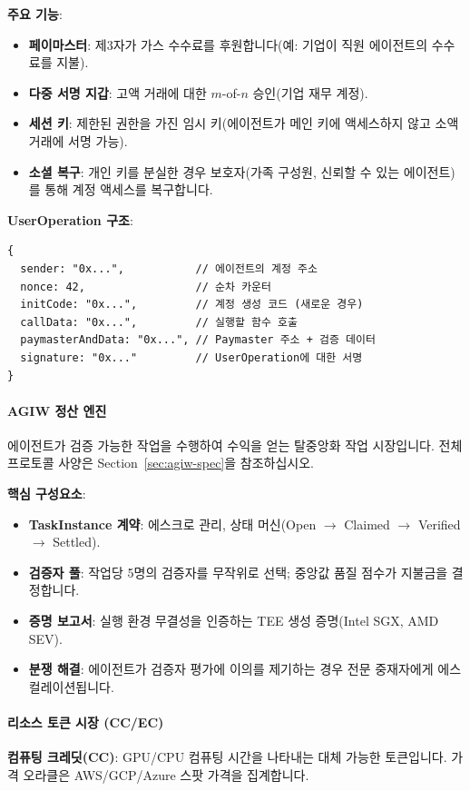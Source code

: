 \documentclass[11pt]{article}
\begin{document}
\textbf{주요 기능}:
\begin{itemize}[noitemsep]
  \item \textbf{페이마스터}: 제3자가 가스 수수료를 후원합니다(예: 기업이 직원 에이전트의 수수료를 지불).
  \item \textbf{다중 서명 지갑}: 고액 거래에 대한 $m$-of-$n$ 승인(기업 재무 계정).
  \item \textbf{세션 키}: 제한된 권한을 가진 임시 키(에이전트가 메인 키에 액세스하지 않고 소액 거래에 서명 가능).
  \item \textbf{소셜 복구}: 개인 키를 분실한 경우 보호자(가족 구성원, 신뢰할 수 있는 에이전트)를 통해 계정 액세스를 복구합니다.
\end{itemize}

\textbf{UserOperation 구조}:
\begin{verbatim}
{
  sender: "0x...",           // 에이전트의 계정 주소
  nonce: 42,                 // 순차 카운터
  initCode: "0x...",         // 계정 생성 코드 (새로운 경우)
  callData: "0x...",         // 실행할 함수 호출
  paymasterAndData: "0x...", // Paymaster 주소 + 검증 데이터
  signature: "0x..."         // UserOperation에 대한 서명
}
\end{verbatim}

\paragraph{AGIW 정산 엔진}
에이전트가 검증 가능한 작업을 수행하여 수익을 얻는 탈중앙화 작업 시장입니다. 전체 프로토콜 사양은 Section~\ref{sec:agiw-spec}을 참조하십시오.

\textbf{핵심 구성요소}:
\begin{itemize}[noitemsep]
  \item \textbf{TaskInstance 계약}: 에스크로 관리, 상태 머신(Open $\to$ Claimed $\to$ Verified $\to$ Settled).
  \item \textbf{검증자 풀}: 작업당 5명의 검증자를 무작위로 선택; 중앙값 품질 점수가 지불금을 결정합니다.
  \item \textbf{증명 보고서}: 실행 환경 무결성을 인증하는 TEE 생성 증명(Intel SGX, AMD SEV).
  \item \textbf{분쟁 해결}: 에이전트가 검증자 평가에 이의를 제기하는 경우 전문 중재자에게 에스컬레이션됩니다.
\end{itemize}

\paragraph{리소스 토큰 시장 (CC/EC)}
\textbf{컴퓨팅 크레딧(CC)}: GPU/CPU 컴퓨팅 시간을 나타내는 대체 가능한 토큰입니다. 가격 오라클은 AWS/GCP/Azure 스팟 가격을 집계합니다.
\end{document}
